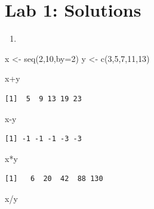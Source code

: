 \documentclass[
  letterpaper,
  DIV=11,
  numbers=noendperiod]{scrreprt}
\newenvironment{Shaded}{\begin{snugshade}}{\end{snugshade}}
\newcommand{\AttributeTok}[1]{\textcolor[rgb]{0.40,0.45,0.13}{#1}}
\newcommand{\DecValTok}[1]{\textcolor[rgb]{0.68,0.00,0.00}{#1}}
\newcommand{\FunctionTok}[1]{\textcolor[rgb]{0.28,0.35,0.67}{#1}}
\newcommand{\NormalTok}[1]{\textcolor[rgb]{0.00,0.23,0.31}{#1}}
\newcommand{\OtherTok}[1]{\textcolor[rgb]{0.00,0.23,0.31}{#1}}
\newcommand{\SpecialCharTok}[1]{\textcolor[rgb]{0.37,0.37,0.37}{#1}}
\providecommand{\tightlist}{%
  \setlength{\itemsep}{0pt}\setlength{\parskip}{0pt}}\usepackage{longtable,booktabs,array}
\begin{document}
\section{Lab 1: Solutions}\label{lab-1-solutions}

\begin{enumerate}
\def\labelenumi{\arabic{enumi}.}
\tightlist
\item
\end{enumerate}

\begin{Shaded}
\begin{Highlighting}[]
\NormalTok{x }\OtherTok{\textless{}{-}} \FunctionTok{seq}\NormalTok{(}\DecValTok{2}\NormalTok{,}\DecValTok{10}\NormalTok{,}\AttributeTok{by=}\DecValTok{2}\NormalTok{)}
\NormalTok{y }\OtherTok{\textless{}{-}} \FunctionTok{c}\NormalTok{(}\DecValTok{3}\NormalTok{,}\DecValTok{5}\NormalTok{,}\DecValTok{7}\NormalTok{,}\DecValTok{11}\NormalTok{,}\DecValTok{13}\NormalTok{)}

\NormalTok{x}\SpecialCharTok{+}\NormalTok{y}
\end{Highlighting}
\end{Shaded}

\begin{verbatim}
[1]  5  9 13 19 23
\end{verbatim}

\begin{Shaded}
\begin{Highlighting}[]
\NormalTok{x}\SpecialCharTok{{-}}\NormalTok{y}
\end{Highlighting}
\end{Shaded}

\begin{verbatim}
[1] -1 -1 -1 -3 -3
\end{verbatim}

\begin{Shaded}
\begin{Highlighting}[]
\NormalTok{x}\SpecialCharTok{*}\NormalTok{y}
\end{Highlighting}
\end{Shaded}

\begin{verbatim}
[1]   6  20  42  88 130
\end{verbatim}

\begin{Shaded}
\begin{Highlighting}[]
\NormalTok{x}\SpecialCharTok{/}\NormalTok{y}
\end{Highlighting}
\end{Shaded}
\end{document}
